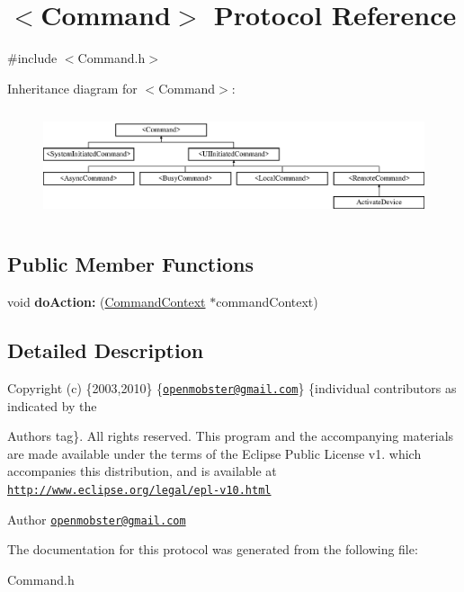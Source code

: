 \hypertarget{protocol_command-p}{
\section{$<$\-Command$>$ \-Protocol \-Reference}
\label{protocol_command-p}
}


{\ttfamily \#include $<$\-Command.\-h$>$}

\-Inheritance diagram for $<$\-Command$>$\-:\begin{figure}[H]
\begin{center}
\leavevmode
\includegraphics[height=3.255814cm]{protocol_command-p}
\end{center}
\end{figure}
\subsection*{\-Public \-Member \-Functions}
\begin{DoxyCompactItemize}
\item 
\hypertarget{protocol_command-p_a87e057964bd959ed4c82e6021527354e}{
void {\bfseries do\-Action\-:} (\hyperlink{interface_command_context}{\-Command\-Context} $\ast$command\-Context)}
\label{protocol_command-p_a87e057964bd959ed4c82e6021527354e}

\end{DoxyCompactItemize}


\subsection{\-Detailed \-Description}
\-Copyright (c) \{2003,2010\} \{\href{mailto:openmobster@gmail.com}{\tt openmobster@gmail.\-com}\} \{individual contributors as indicated by the \begin{DoxyAuthor}{\-Authors}
tag\}. \-All rights reserved. \-This program and the accompanying materials are made available under the terms of the \-Eclipse \-Public \-License v1. which accompanies this distribution, and is available at \href{http://www.eclipse.org/legal/epl-v10.html}{\tt http\-://www.\-eclipse.\-org/legal/epl-\/v10.\-html}
\end{DoxyAuthor}
\begin{DoxyAuthor}{\-Author}
\href{mailto:openmobster@gmail.com}{\tt openmobster@gmail.\-com} 
\end{DoxyAuthor}


\-The documentation for this protocol was generated from the following file\-:\begin{DoxyCompactItemize}
\item 
\-Command.\-h\end{DoxyCompactItemize}
